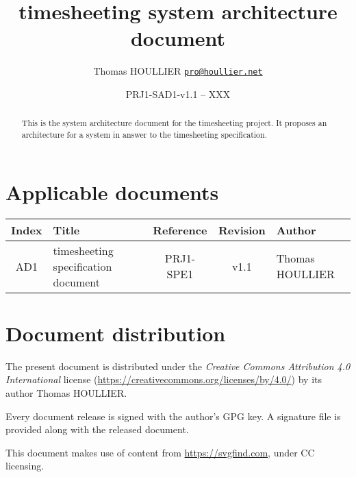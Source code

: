 \documentclass[letterpaper]{article}
\title{timesheeting system architecture document}
\author{Thomas HOULLIER \href{mailto:pro@houllier.net}
         {\texttt{\textlangle pro@houllier.net\textrangle}}}
\begin{document}
\frenchspacing
\date{PRJ1-SAD1-v1.1 -- XXX}
\maketitle
\thispagestyle{FirstPage}

\begin{abstract}
  This is the system architecture document for the timesheeting project.
  It proposes an architecture for a system in answer to the timesheeting
  specification.
\end{abstract}

\begin{versionhistory}
\end{versionhistory}
\setcounter{table}{0} %

\section*{Applicable documents}
{ \centering
\begin{tabularx}{\textwidth}{| c | X | c | c | X |} \hline
  Index & Title & Reference & Revision & Author \\ \hline
  AD1   & timesheeting specification document & PRJ1-SPE1 & v1.1 & Thomas HOULLIER \\
  \hline \end{tabularx} \par }

\section*{Document distribution}
The present document is distributed under the \emph{Creative Commons Attribution
4.0 International} license (\url{https://creativecommons.org/licenses/by/4.0/})
by its author Thomas HOULLIER.

Every document release is signed with the author's GPG key. A signature file
is provided along with the released document.

This document makes use of content from \url{https://svgfind.com}, under
CC licensing.

\tableofcontents
\printglossary[type=\acronymtype,style=index]
\pagestyle{plain}





\appendix


\apptocmd{\thebibliography}{\raggedright}{}{}
\begingroup
{}
\setlength\bibitemsep{0pt}
\printbibliography
\endgroup
\end{document}
